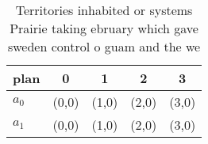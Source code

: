 \documentclass[a4paper]{article}
\begin{document}
\begin{table}
\begin{adjustbox}{width=0.5\columnwidth}
\begin{tabular}{|l|l|l|l|l|}
\hline
\textbf{plan} & \multicolumn{1}{c|}{\textbf{0}} & \multicolumn{1}{c|}{\textbf{1}} & \multicolumn{1}{c|}{\textbf{2}} & \multicolumn{1}{c|}{\textbf{3}} \\ \hline
\textbf{$a_0$}  & (0,0) & (1,0) & (2,0) & (3,0) \\ \hline
\textbf{$a_1$}  & (0,0) & (1,0) & (2,0) & (3,0) \\ \hline
\end{tabular}
\end{adjustbox}
\caption{Territories inhabited or systems Prairie taking ebruary which gave sweden control o guam and the we
}
\end{table}
\end{document}
